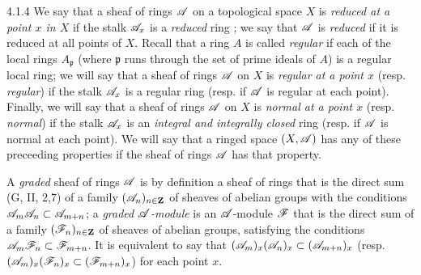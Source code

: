 \begin{env}{4.1.4}
\label{env-0.4.1.4}
We say that a sheaf of rings $\mathscr{A}$ on a topological space $X$ is
\emph{reduced at a point $x$ in $X$} if the stalk $\mathscr{A}_x$ is a \emph{reduced}
ring ; we say that $\mathscr{A}$ is \emph{reduced} if it is reduced
at all points of $X$. Recall that a ring $A$ is called \emph{regular} if each of
the local rings $A_\mathfrak{p}$ (where $\mathfrak{p}$ runs through the set of
prime ideals of $A$) is a regular local ring; we will say that a sheaf of rings
$\mathscr{A}$ on $X$ is \emph{regular at a point $x$} (resp. \emph{regular}) if the
stalk $\mathscr{A}_x$ is a regular ring (resp. if $\mathscr{A}$ is regular at each point).
Finally, we will say that a sheaf of rings $\mathscr{A}$ on $X$ is \emph{normal at a
point $x$} (resp. \emph{normal}) if the stalk $\mathscr{A}_x$ is an \emph{integral
and integrally closed} ring (resp. if $\mathscr{A}$ is normal at each point). We will
say that a ringed space $(X,\mathscr{A})$ has any of these preceeding properties if
the sheaf of rings $\mathscr{A}$ has that property.

A \emph{graded} sheaf of rings $\mathscr{A}$ is by definition a sheaf of rings that
is the direct sum (G, II, 2,7) of a family $(\mathscr{A}_n)_{n\in\mathbf{Z}}$ of sheaves
of abelian groups with the conditions $\mathscr{A}_m\mathscr{A}_n\subset\mathscr{A}_{m+n}$; a
\emph{graded $\mathscr{A}$-module} is an $\mathscr{A}$-module $\mathscr{F}$ that is the direct
sum of a family $(\mathscr{F}_n)_{n\in\mathbf{Z}}$ of sheaves of abelian groups,
satisfying the conditions $\mathscr{A}_m\mathscr{F}_n\subset\mathscr{F}_{m+n}$. It is
equivalent to say that $(\mathscr{A}_m)_x(\mathscr{A}_n)_x\subset(\mathscr{A}_{m+n})_x$
(resp. $(\mathscr{A}_m)_x(\mathscr{F}_n)_x\subset(\mathscr{F}_{m+n})_x$) for each point $x$.
\end{env}

